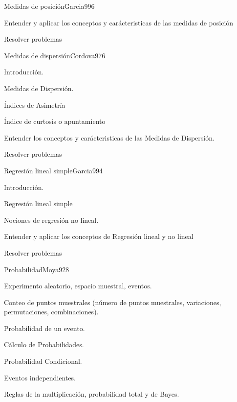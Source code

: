 \begin{syllabus}
\begin{unit}{Medidas de posición}{Garcia99}{6}
   \begin{learningoutcomes}
         \item  Entender y aplicar los conceptos y carácteristicas de las medidas de posición
         \item  Resolver problemas
   \end{learningoutcomes}
\end{unit}

\begin{unit}{Medidas de dispersión}{Cordova97}{6}
   \begin{topics}
         \item  Introducción.
	 \item  Medidas de Dispersión.
         \item  Índices de Asimetría
	 \item  Índice de curtosis o apuntamiento
   \end{topics}

   \begin{learningoutcomes}
         \item  Entender los conceptos y carácteristicas de las Medidas de Dispersión.
         \item  Resolver problemas
   \end{learningoutcomes}
\end{unit}

\begin{unit}{Regresión lineal simple}{Garcia99}{4}
   \begin{topics}
         \item  Introducción.
	 \item  Regresión lineal simple
         \item  Nociones de regresión no lineal.
   \end{topics}

   \begin{learningoutcomes}
         \item  Entender y aplicar los conceptos de Regresión lineal y no lineal
         \item  Resolver problemas
   \end{learningoutcomes}
\end{unit}

\begin{unit}{Probabilidad}{Moya92}{8}
   \begin{topics}
         \item  Experimento aleatorio, espacio muestral, eventos.
	 \item  Conteo de puntos muestrales (número de puntos muestrales, variaciones, permutaciones, combinaciones).
         \item  Probabilidad de un evento.
	 \item  Cálculo de Probabilidades.
	\item Probabilidad Condicional.
	\item Eventos independientes.
	\item Reglas de la multiplicación, probabilidad total y de Bayes.
   \end{topics}


\end{unit}
\end{syllabus}
